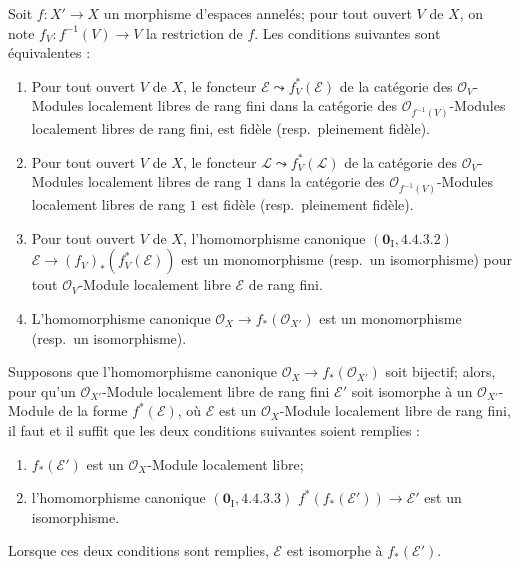 \begin{lemma}[21.13.2]
\label{IV.21.13.2}
Soit $f:X'\to X$ un morphisme d'espaces annelés; pour tout ouvert $V$ de $X$, on
note $f_V:f^{-1}(V)\to V$ la restriction de $f$. Les conditions suivantes sont
équivalentes :
\begin{enumerate}[label=\emph{\alph*)}]
  \item Pour tout ouvert $V$ de $X$, le foncteur
  $\mathscr E\leadsto f_V^*(\mathscr E)$ de la catégorie des $\mathcal O_V$-Modules
  localement libres de rang fini dans la catégorie des
  $\mathcal O_{f^{-1}(V)}$-Modules localement libres de rang fini, est fidèle
  \textup{(resp.}\ pleinement fidèle\textup{)}.
  \item[\emph{a')}] Pour tout ouvert $V$ de $X$, le foncteur
  $\mathscr L\leadsto f_V^*(\mathscr L)$ de la catégorie des $\mathcal O_V$-Modules
  localement libres de rang $1$ dans la catégorie des
  $\mathcal O_{f^{-1}(V)}$-Modules localement libres de rang $1$ est fidèle
  \textup{(resp.}\ pleinement fidèle\textup{)}.
  \item Pour tout ouvert $V$ de $X$, l'homomorphisme canonique
  $(\mathbf 0_{\mathrm I}, 4.4.3.2)$
  $\mathscr E\to(f_V)_*(f_V^*(\mathscr E))$ est un monomorphisme
  \textup{(resp.}\ un isomorphisme\textup{)} pour tout $\mathcal O_V$-Module localement libre
  $\mathscr E$ de rang fini.
  \item[\emph{b')}] L'homomorphisme canonique
  $\mathcal O_X\to f_*(\mathcal O_{X'})$ est un monomorphisme
  \textup{(resp.}\ un isomorphisme\textup{)}.
\end{enumerate}

Supposons que l'homomorphisme canonique $\mathcal O_X\to f_*(\mathcal O_{X'})$ soit
bijectif; alors, pour qu'un $\mathcal O_{X'}$-Module localement libre de rang fini
$\mathscr E'$ soit isomorphe à un $\mathcal O_{X'}$-Module de la forme
$f^*(\mathscr E)$, où $\mathscr E$ est un $\mathcal O_X$-Module localement libre de
rang fini, il faut et il suffit que les deux conditions suivantes soient remplies :
\begin{enumerate}[label=\textup{(\roman*)}]
  \item $f_*(\mathscr E')$ est un $\mathcal O_X$-Module localement libre;
  \item l'homomorphisme canonique $(\mathbf 0_{\mathrm I}, 4.4.3.3)$
  $f^*(f_*(\mathscr E'))\to\mathscr E'$ est un isomorphisme.
\end{enumerate}

Lorsque ces deux conditions sont remplies, $\mathscr E$ est isomorphe à
$f_*(\mathscr E')$.
\end{lemma}

